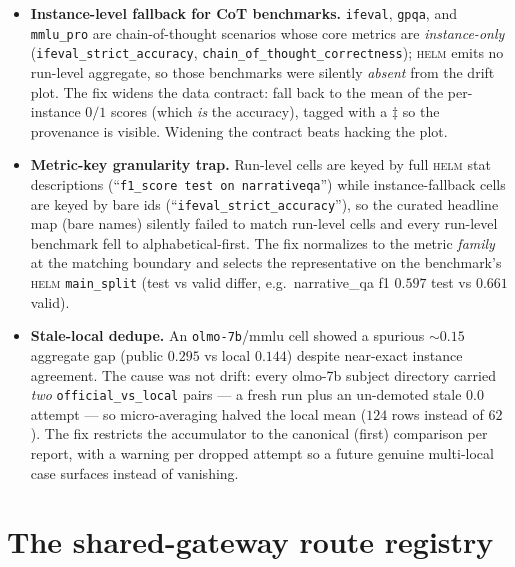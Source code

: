 \documentclass[11pt]{report}
\newcommand{\code}[1]{\texttt{#1}}
\begin{document}
\begin{itemize}[nosep]
  \item \textbf{Instance-level fallback for CoT benchmarks.} \code{ifeval},
        \code{gpqa}, and \code{mmlu\_pro} are chain-of-thought scenarios whose core
        metrics are \emph{instance-only} (\code{ifeval\_strict\_accuracy},
        \code{chain\_of\_thought\_correctness}); \textsc{helm} emits no run-level
        aggregate, so those benchmarks were silently \emph{absent} from the drift
        plot. The fix widens the data contract: fall back to the mean of the
        per-instance $0/1$ scores (which \emph{is} the accuracy), tagged with a
        $\ddagger$ so the provenance is visible. Widening the contract beats hacking
        the plot.
  \item \textbf{Metric-key granularity trap.} Run-level cells are keyed by full
        \textsc{helm} stat descriptions (``\code{f1\_score test on narrativeqa}'')
        while instance-fallback cells are keyed by bare ids
        (``\code{ifeval\_strict\_accuracy}''), so the curated headline map (bare
        names) silently failed to match run-level cells and every run-level
        benchmark fell to alphabetical-first. The fix normalizes to the metric
        \emph{family} at the matching boundary and selects the representative on the
        benchmark's \textsc{helm} \code{main\_split} (test vs valid differ, e.g.\
        narrative\_qa f1 $0.597$ test vs $0.661$ valid).
  \item \textbf{Stale-local dedupe.} An \code{olmo-7b}/mmlu cell showed a spurious
        $\sim\!0.15$ aggregate gap (public $0.295$ vs local $0.144$) despite
        near-exact instance agreement. The cause was not drift: every olmo-7b
        subject directory carried \emph{two} \code{official\_vs\_local} pairs --- a
        fresh run plus an un-demoted stale $0.0$ attempt --- so micro-averaging
        halved the local mean ($124$ rows instead of $62$). The fix restricts the
        accumulator to the canonical (first) comparison per report, with a warning
        per dropped attempt so a future genuine multi-local case surfaces instead of
        vanishing.
\end{itemize}

\section{The shared-gateway route registry}
\end{document}
